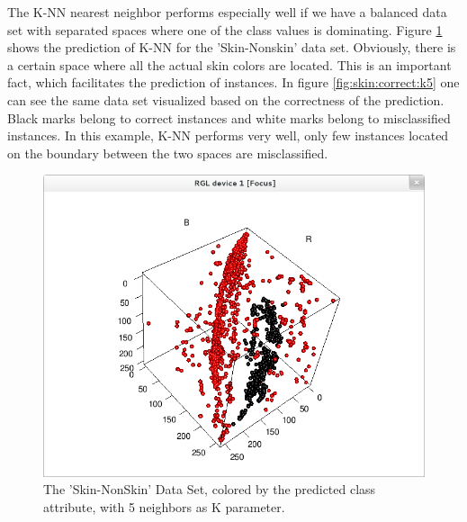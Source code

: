 \documentclass[paper=a4, fontsize=11pt]{scrartcl} %
\numberwithin{equation}{section} %
\numberwithin{figure}{section} %
\numberwithin{table}{section} %
\begin{document}
The K-NN nearest neighbor performs especially well if we have a balanced data set with separated spaces where one of the class values is dominating. Figure \ref{fig:skin:predicted:k5} shows the prediction of K-NN for the 'Skin-Nonskin' data set. Obviously, there is a certain space where all the actual skin colors are located. This is an important fact, which facilitates the prediction of instances. In figure \ref{fig:skin:correct:k5} one can see the same data set visualized based on the correctness of the prediction. Black marks belong to correct instances and white marks belong to misclassified instances. In this example, K-NN performs very well, only few instances located on the boundary between the two spaces are misclassified.

\begin{figure}[\textwidth]
    \begin{center}
        \includegraphics[width=\textwidth]{Skin_predicted_k5}
    \end{center}
    \caption['Skin-NonSkin' prediction with k=5]{The 'Skin-NonSkin' Data Set, colored by the predicted class attribute, with 5 neighbors as K parameter.}
    \label{fig:skin:predicted:k5}
\end{figure}
\end{document}

